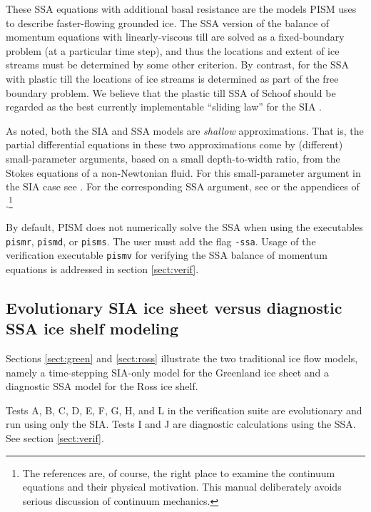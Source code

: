 \documentclass[11pt,final]{amsart}
\newcommand{\pismoptionindex}[1]{\index{options for PISM (and PETSc)!\texttt{-#1}}}
\newcommand{\intextoption}[1]{\texttt{-#1}\pismoptionindex{#1}}
\begin{document}
These SSA equations with additional basal resistance are the models PISM uses to describe faster-flowing grounded ice.  The SSA version of the balance of momentum equations with linearly-viscous till are solved as a fixed-boundary problem (at a particular time step), and thus the locations and extent of ice streams must be determined by some other criterion.  By contrast, for the SSA with plastic till the locations of ice streams is determined as part of the free boundary problem.  We believe that the plastic till SSA of Schoof should be regarded as the best currently implementable ``sliding law'' for the SIA \cite{BBssasliding}.

As noted, both the SIA and SSA models are \emph{shallow} approximations.  That is, the partial differential equations in these two approximations come by (different) small-parameter arguments, based on a small depth-to-width ratio, from the Stokes equations of a non-Newtonian fluid.  For this small-parameter argument in the SIA case see \cite{Fowler}.  For the corresponding SSA argument, see \cite{WeisGreveHutter} or the appendices of \cite{SchoofStream}.\footnote{The references are, of course, the right place to examine the continuum equations and their physical motivation.  This manual deliberately avoids serious discussion of continuum mechanics.}

By default, PISM does not numerically solve the SSA when using the executables \verb|pismr|, \verb|pismd|, or \verb|pisms|.  The user must add the flag \intextoption{ssa}.  Usage of the verification executable \verb|pismv| for verifying the SSA balance of momentum equations is addressed in section \ref{sect:verif}.


\subsection{Evolutionary SIA ice sheet versus diagnostic SSA ice shelf modeling} \label{subsect:basicmodes}  Sections \ref{sect:green} and \ref{sect:ross} illustrate the two traditional ice flow models, namely a time-stepping SIA-only model for the Greenland ice sheet and a diagnostic SSA model for the Ross ice shelf.

Tests A, B, C, D, E, F, G, H, and L in the verification suite are evolutionary and run using only the SIA.  Tests I and J are diagnostic calculations using the SSA.  See section \ref{sect:verif}.
\end{document}
